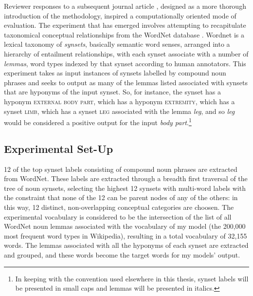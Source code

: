 Reviewer responses to a subsequent journal article \citep{McGregorEA2015c}, designed as a more thorough introduction of the methodology, inspired a computationally oriented mode of evaluation.  The experiment that has emerged involves attempting to recapitulate taxonomical conceptual relationships from the WordNet database \citep{Fellbaum1998}.  Wordnet is a lexical taxonomy of \emph{synsets}, basically semantic word senses, arranged into a hierarchy of entailment relationships, with each synset associate with a number of \emph{lemmas}, word types indexed by that synset according to human annotators.  This experiment takes as input instances of synsets labelled by compound noun phrases and seeks to output as many of the lemmas listed associated with synsets that are hyponyms of the input synset.  So, for instance, the synset  has a hyponym \textsc{external body part}, which has a hyponym \textsc{extremity}, which has a synset \textsc{limb}, which has a synset \textsc{leg} associated with the lemma \emph{leg}, and so \emph{leg} would be considered a positive output for the input \emph{body part}.\footnote{In keeping with the convention used elsewhere in this thesis, synset labels will be presented in small caps and lemmas will be presented in italics.}

\subsection{Experimental Set-Up}
12 of the top synset labels consisting of compound noun phrases are extracted from WordNet.  These labels are extracted through a breadth first traversal of the tree of noun synsets, selecting the highest 12 synsets with multi-word labels with the constraint that none of the 12 can be parent nodes of any of the others: in this way, 12 distinct, non-overlapping conceptual categories are choosen.  The experimental vocabulary is considered to be the intersection of the list of all WordNet noun lemmas associated with the vocabulary of my model (the 200,000 most frequent word types in Wikipedia), resulting in a total vocabulary of 32,155 words.  The lemmas associated with all the hyponyms of each synset are extracted and grouped, and these words become the target words for my models' output.

